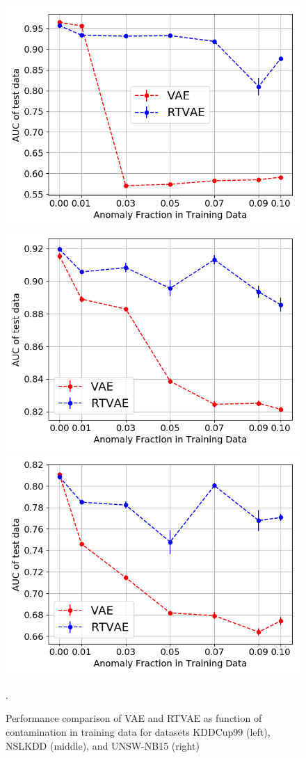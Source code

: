 \documentclass{article}
\theoremstyle{plain}
\theoremstyle{definition}
\begin{document}
 \begin{figure}[t!]
	\centering
	\includegraphics[scale=.33]{./figures/auc_original_kdd_regularizer_kld.png}
	\includegraphics[scale=.33]{./figures/auc_kdd_regularizer_kld.png}
	\includegraphics[scale=.33]{./figures/auc_UNSW_regularizer_kld.png}
	\caption{Performance comparison of VAE and RTVAE as function of contamination in training data for datasets KDDCup99 (left), NSLKDD (middle), and UNSW-NB15 (right)}.
	\label{fig:results}
\end{figure}
\end{document}
